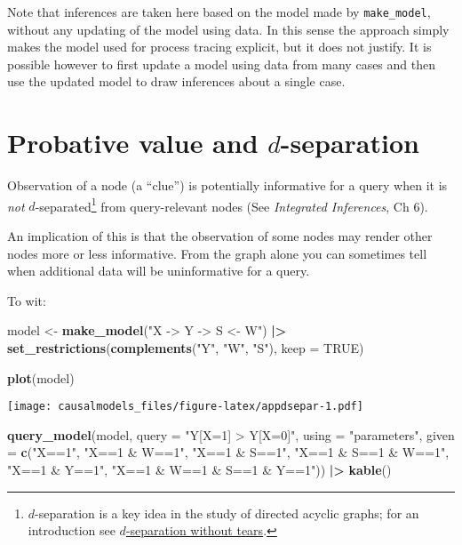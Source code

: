 \documentclass[
  12pt,
]{book}
\newenvironment{Shaded}{\begin{snugshade}}{\end{snugshade}}
\newcommand{\AttributeTok}[1]{\textcolor[rgb]{0.13,0.29,0.53}{#1}}
\newcommand{\ConstantTok}[1]{\textcolor[rgb]{0.56,0.35,0.01}{#1}}
\newcommand{\FunctionTok}[1]{\textcolor[rgb]{0.13,0.29,0.53}{\textbf{#1}}}
\newcommand{\NormalTok}[1]{#1}
\newcommand{\OtherTok}[1]{\textcolor[rgb]{0.56,0.35,0.01}{#1}}
\newcommand{\SpecialCharTok}[1]{\textcolor[rgb]{0.81,0.36,0.00}{\textbf{#1}}}
\newcommand{\StringTok}[1]{\textcolor[rgb]{0.31,0.60,0.02}{#1}}
\begin{document}
Note that inferences are taken here based on the model made by \texttt{make\_model}, without any updating of the model using data. In this sense the approach simply makes the model used for process tracing explicit, but it does not justify. It is possible however to first update a model using data from many cases and then use the updated model to draw inferences about a single case.

\hypertarget{probative-value-and-d-separation}{%
\section{\texorpdfstring{Probative value and \(d\)-separation}{Probative value and d-separation}}\label{probative-value-and-d-separation}}

Observation of a node (a ``clue'') is potentially informative for a query when it is \emph{not} \(d\)-separated\footnote{\(d\)-separation is a key idea in the study of directed acyclic graphs; for an introduction see \href{http://www.dagitty.net/learn/dsep/index\%3C-.html}{\(d\)-separation without tears}.} from query-relevant nodes (See \emph{Integrated Inferences}, Ch 6).

An implication of this is that the observation of some nodes may render other nodes more or less informative. From the graph alone you can sometimes tell when additional data will be uninformative for a query.

To wit:

\begin{Shaded}
\begin{Highlighting}[]
\NormalTok{model }\OtherTok{\textless{}{-}} \FunctionTok{make\_model}\NormalTok{(}\StringTok{"X {-}\textgreater{} Y {-}\textgreater{} S \textless{}{-} W"}\NormalTok{) }\SpecialCharTok{|\textgreater{}} 
  \FunctionTok{set\_restrictions}\NormalTok{(}\FunctionTok{complements}\NormalTok{(}\StringTok{"Y"}\NormalTok{, }\StringTok{"W"}\NormalTok{, }\StringTok{"S"}\NormalTok{), }\AttributeTok{keep =} \ConstantTok{TRUE}\NormalTok{)}

\FunctionTok{plot}\NormalTok{(model)}
\end{Highlighting}
\end{Shaded}

\texttt{[image: causalmodels\_files/figure-latex/appdsepar-1.pdf]}

\begin{Shaded}
\begin{Highlighting}[]
\FunctionTok{query\_model}\NormalTok{(model,}
            \AttributeTok{query =} \StringTok{"Y[X=1] \textgreater{} Y[X=0]"}\NormalTok{,}
            \AttributeTok{using =} \StringTok{"parameters"}\NormalTok{,}
            \AttributeTok{given =} \FunctionTok{c}\NormalTok{(}\StringTok{"X==1"}\NormalTok{,}
                      \StringTok{"X==1 \& W==1"}\NormalTok{,}
                      \StringTok{"X==1 \& S==1"}\NormalTok{,}
                      \StringTok{"X==1 \& S==1 \& W==1"}\NormalTok{, }
                      \StringTok{"X==1 \& Y==1"}\NormalTok{,}
                      \StringTok{"X==1 \& W==1 \& S==1 \& Y==1"}\NormalTok{)) }\SpecialCharTok{|\textgreater{}} \FunctionTok{kable}\NormalTok{()}
\end{Highlighting}
\end{Shaded}
\end{document}
